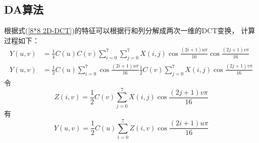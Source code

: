 \documentclass{article}
\numberwithin {equation}{section}
\begin{document}
\begin{spacing}{1.25}
    \subsection{DA算法}
      \vspace{1em}
      根据式(\ref{8*8 2D-DCT})的特征可以根据行和列分解成两次一维的DCT变换，
      计算过程如下：
      \begin{equation*}
        \begin{aligned}
          Y(u,v)&=\frac{1}{4}C(u)C(v)\sum_{i=0}^{7}\sum_{j=0}^{7}X(i,j)
          \cos\frac{(2i+1)u\pi}{16}\cos\frac{(2j+1)v\pi}{16}\\
          Y(u,v)&=\frac{1}{2}C(u)\sum_{i=0}^{7}\cos\frac{(2i+1)u\pi}{16}
          \frac{1}{2}C(v)\sum_{j=0}^{7}X(i,j)\cos\frac{(2j+1)v\pi}{16}
        \end{aligned}
      \end{equation*}
      令
      \begin{equation}
        Z(i,v)=\frac{1}{2}C(v)\sum_{j=0}^{7}X(i,j)\cos\frac{(2j+1)v\pi}{16}
        \label{colDCT}
      \end{equation}
      有
      \begin{equation} 
        Y(u,v)=\frac{1}{2}C(u)\sum_{i=0}^{7}
        Z(i,v)\cos\frac{(2i+1)u\pi}{16}
        \label{rowDCT}
      \end{equation}


\end{spacing}
\end{document}
